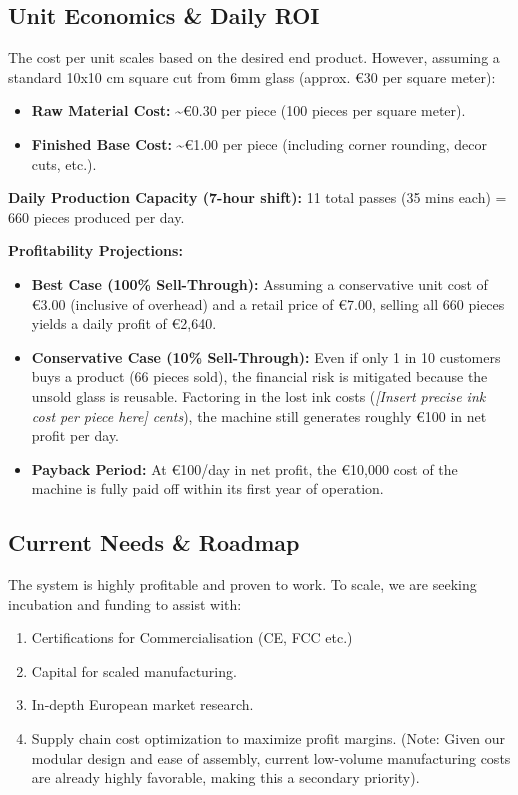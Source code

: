 \documentclass[11pt, a4paper]{article}
\begin{document}
\subsection*{Unit Economics \& Daily ROI}
The cost per unit scales based on the desired end product. However,
assuming a standard 10x10 cm square cut from 6mm glass (approx. €30
per square meter):

\begin{itemize}
	\item \textbf{Raw Material Cost:} \textasciitilde€0.30 per piece
		(100 pieces per square meter).
	\item \textbf{Finished Base Cost:} \textasciitilde€1.00 per piece
		(including corner rounding, decor cuts, etc.).
\end{itemize}

\textbf{Daily Production Capacity (7-hour shift):}
11 total passes (35 mins each) = 660 pieces produced per day.

\textbf{Profitability Projections:}
\begin{itemize}
	\item \textbf{Best Case (100\% Sell-Through):} Assuming a
		conservative unit cost of €3.00 (inclusive of overhead) and a
		retail price of €7.00, selling all 660 pieces yields a daily profit of €2,640.
	\item \textbf{Conservative Case (10\% Sell-Through):} Even if only 1
		in 10 customers buys a product (66 pieces sold), the financial risk
		is mitigated because the unsold glass is reusable. Factoring in the
		lost ink costs (\textit{[Insert precise ink cost per piece here]
		cents}), the machine still generates roughly €100 in net profit per day.
	\item \textbf{Payback Period:} At €100/day in net profit, the
		€10,000 cost of the machine is fully paid off within its first year
		of operation.
\end{itemize}

\subsection*{Current Needs \& Roadmap}
The system is highly profitable and proven to work. To scale, we are
seeking incubation and funding to assist with:
\begin{enumerate}
	\item Certifications for Commercialisation (CE, FCC etc.)
	\item Capital for scaled manufacturing.
	\item In-depth European market research.
	\item Supply chain cost optimization to maximize profit margins.
		(Note: Given our modular design and ease of assembly, current
			low-volume manufacturing costs are already highly favorable, making
		this a secondary priority).
\end{enumerate}
\end{document}
